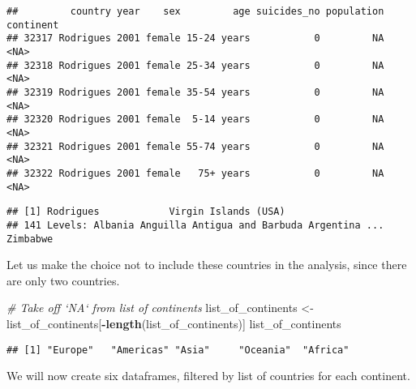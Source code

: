 \documentclass[]{article}
\newenvironment{Shaded}{\begin{snugshade}}{\end{snugshade}}
\newcommand{\CommentTok}[1]{\textcolor[rgb]{0.56,0.35,0.01}{\textit{#1}}}
\newcommand{\ControlFlowTok}[1]{\textcolor[rgb]{0.13,0.29,0.53}{\textbf{#1}}}
\newcommand{\KeywordTok}[1]{\textcolor[rgb]{0.13,0.29,0.53}{\textbf{#1}}}
\newcommand{\NormalTok}[1]{#1}
\newcommand{\OperatorTok}[1]{\textcolor[rgb]{0.81,0.36,0.00}{\textbf{#1}}}
\newcommand{\StringTok}[1]{\textcolor[rgb]{0.31,0.60,0.02}{#1}}
\begin{document}
\begin{verbatim}
##         country year    sex         age suicides_no population continent
## 32317 Rodrigues 2001 female 15-24 years           0         NA      <NA>
## 32318 Rodrigues 2001 female 25-34 years           0         NA      <NA>
## 32319 Rodrigues 2001 female 35-54 years           0         NA      <NA>
## 32320 Rodrigues 2001 female  5-14 years           0         NA      <NA>
## 32321 Rodrigues 2001 female 55-74 years           0         NA      <NA>
## 32322 Rodrigues 2001 female   75+ years           0         NA      <NA>
\end{verbatim}

\begin{Shaded}
\end{Shaded}

\begin{verbatim}
## [1] Rodrigues            Virgin Islands (USA)
## 141 Levels: Albania Anguilla Antigua and Barbuda Argentina ... Zimbabwe
\end{verbatim}

Let us make the choice not to include these countries in the analysis,
since there are only two countries.

\begin{Shaded}
\begin{Highlighting}[]
\CommentTok{# Take off `NA` from list of continents}
\NormalTok{list_of_continents <-}\StringTok{ }\NormalTok{list_of_continents[}\OperatorTok{-}\KeywordTok{length}\NormalTok{(list_of_continents)]}
\NormalTok{list_of_continents}
\end{Highlighting}
\end{Shaded}

\begin{verbatim}
## [1] "Europe"   "Americas" "Asia"     "Oceania"  "Africa"
\end{verbatim}

We will now create six dataframes, filtered by list of countries for
each continent.

\begin{Shaded}
\end{Shaded}
\end{document}
